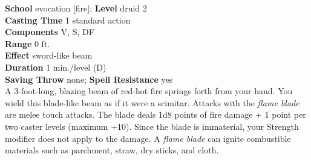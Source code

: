 \textbf{School} evocation [fire]; \textbf{Level} druid 2\\
\textbf{Casting Time} 1 standard action\\
\textbf{Components} V, S, DF\\
\textbf{Range} 0 ft.\\
\textbf{Effect} sword-like beam\\
\textbf{Duration} 1 min./level (D)\\
\textbf{Saving Throw} none; \textbf{Spell Resistance} yes\\
A 3-foot-long, blazing beam of red-hot fire springs forth from your hand. You wield this blade-like beam as if it were a scimitar. Attacks with the \textit{flame blade }are melee touch attacks. The blade deals 1d8 points of fire damage + 1 point per two caster levels (maximum +10). Since the blade is immaterial, your Strength modifier does not apply to the damage. A \textit{flame blade }can ignite combustible materials such as parchment, straw, dry sticks, and cloth.\\
